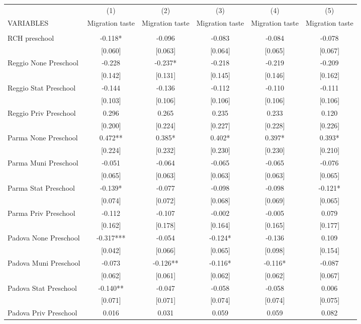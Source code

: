\begin{tabular}{lccccc} \hline
 & (1) & (2) & (3) & (4) & (5) \\
VARIABLES & Migration taste & Migration taste & Migration taste & Migration taste & Migration taste \\ \hline
 &  &  &  &  &  \\
RCH preschool & -0.118* & -0.096 & -0.083 & -0.084 & -0.078 \\
 & [0.060] & [0.063] & [0.064] & [0.065] & [0.067] \\
Reggio None Preschool & -0.228 & -0.237* & -0.218 & -0.219 & -0.209 \\
 & [0.142] & [0.131] & [0.145] & [0.146] & [0.162] \\
Reggio Stat Preschool & -0.144 & -0.136 & -0.112 & -0.110 & -0.111 \\
 & [0.103] & [0.106] & [0.106] & [0.106] & [0.106] \\
Reggio Priv Preschool & 0.296 & 0.265 & 0.235 & 0.233 & 0.120 \\
 & [0.200] & [0.224] & [0.227] & [0.228] & [0.226] \\
Parma None Preschool & 0.472** & 0.385* & 0.402* & 0.397* & 0.393* \\
 & [0.224] & [0.232] & [0.230] & [0.230] & [0.210] \\
Parma Muni Preschool & -0.051 & -0.064 & -0.065 & -0.065 & -0.076 \\
 & [0.065] & [0.063] & [0.063] & [0.063] & [0.065] \\
Parma Stat Preschool & -0.139* & -0.077 & -0.098 & -0.098 & -0.121* \\
 & [0.074] & [0.072] & [0.068] & [0.069] & [0.065] \\
Parma Priv Preschool & -0.112 & -0.107 & -0.002 & -0.005 & 0.079 \\
 & [0.162] & [0.178] & [0.164] & [0.165] & [0.177] \\
Padova None Preschool & -0.317*** & -0.054 & -0.124* & -0.136 & 0.109 \\
 & [0.042] & [0.066] & [0.065] & [0.098] & [0.154] \\
Padova Muni Preschool & -0.073 & -0.126** & -0.116* & -0.116* & -0.087 \\
 & [0.062] & [0.061] & [0.062] & [0.062] & [0.067] \\
Padova Stat Preschool & -0.140** & -0.047 & -0.058 & -0.058 & 0.006 \\
 & [0.071] & [0.071] & [0.074] & [0.074] & [0.075] \\
Padova Priv Preschool & 0.016 & 0.031 & 0.059 & 0.059 & 0.082 \\

\end{tabular}
